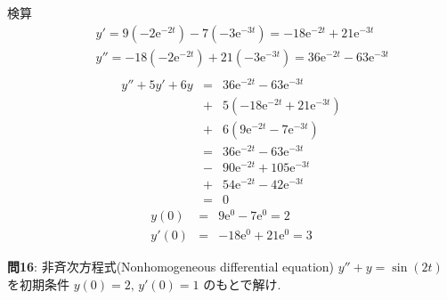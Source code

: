 ﻿\documentclass[a4j]{jarticle}
\begin{document}
検算
\begin{eqnarray*}
&\,& y'  = 9(-2\mathrm{e}^{-2t}) - 7 (-3\mathrm{e}^{-3t}) = -18\mathrm{e}^{-2t} + 21 \mathrm{e}^{-3t} \\
&\,& y'' = -18(-2\mathrm{e}^{-2t}) + 21(-3\mathrm{e}^{-3t}) = 36\mathrm{e}^{-2t} - 63\mathrm{e}^{-3t} \\
\end{eqnarray*}
\begin{eqnarray*}
y''+5y'+6y &=& 36\mathrm{e}^{-2t} - 63\mathrm{e}^{-3t} \\
           &+& 5(-18\mathrm{e}^{-2t} + 21 \mathrm{e}^{-3t}) \\
           &+& 6(9\mathrm{e}^{-2t} - 7 \mathrm{e}^{-3t}) \\
           &=& 36\mathrm{e}^{-2t} - 63\mathrm{e}^{-3t} \\
           &-& 90\mathrm{e}^{-2t} + 105\mathrm{e}^{-3t} \\
           &+& 54\mathrm{e}^{-2t} - 42 \mathrm{e}^{-3t} \\
           &=& 0
\end{eqnarray*}
\begin{eqnarray*}
 y(0) &=& 9\mathrm{e}^{0} - 7 \mathrm{e}^{0} = 2 \\
y'(0) &=& -18\mathrm{e}^{0} + 21 \mathrm{e}^{0} = 3
\end{eqnarray*}

\noindent
{\large {\bf 問16}}: 非斉次方程式(Nonhomogeneous differential equation) \(y''+y=\sin(2t) \) を初期条件 \( y(0)=2 ,\, y'(0)=1 \) のもとで解け.
\end{document}
